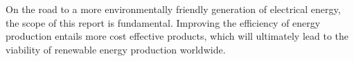 On the road to a more environmentally friendly generation of electrical energy, the scope of this report is fundamental. Improving the efficiency of energy production entails more cost effective products, which will ultimately lead to the viability of renewable energy production worldwide.